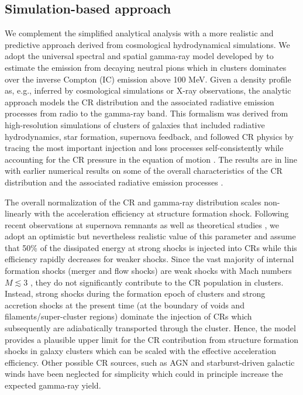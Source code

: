 \documentclass[12pt,manuscript]{aastex}
\begin{document}
\subsection{Simulation-based approach}
\label{sec:simulation}
We complement the simplified analytical analysis with a more realistic and predictive approach
derived from cosmological hydrodynamical simulations. We adopt the universal spectral and spatial
gamma-ray model developed by \citet{article:PinzkePfrommer:2010} to estimate the emission from
decaying neutral pions which in clusters dominates over the inverse Compton (IC) emission above
100 MeV. Given a density profile as, e.g., inferred by
cosmological simulations or X-ray observations, the analytic approach models the CR distribution and
the associated radiative emission processes from radio to the gamma-ray band. This formalism was
derived from high-resolution simulations of clusters of galaxies that included radiative hydrodynamics,
star formation, supernova feedback, and followed CR physics by tracing the most important injection
and loss processes self-consistently while accounting for the CR pressure in the equation of motion
\citep{article:PfrommerSpringelEnsslinJubelgas, article:EnsslinPfrommerSpringelJubelgas:2007,
  article:JubelgasSpringelEnsslinPfrommer:2008}. The results are in line with earlier numerical
results on some of the overall characteristics of the CR distribution and the associated radiative
emission processes \citep{article:DolagEnsslin:2000, article:MiniatiRyuKangJones:2001,
  article:Miniati:2003, article:Pfrommer_etal:2007, article:PfrommerEnsslinSpringel:2008,
  article:Pfrommer:2008}.
 
The overall normalization of the CR and gamma-ray distribution scales non-linearly with the
acceleration efficiency at structure formation shock. Following recent observations at
supernova remnants \citep{article:Helder_etal:2009} as well as theoretical studies
\citep{article:KangJones:2005}, we adopt an optimistic but nevertheless realistic value of this
parameter and assume that 50\% of the dissipated energy at strong shocks is injected into CRs while
this efficiency rapidly decreases for weaker shocks. Since the vast majority of internal formation
shocks (merger and flow shocks) are weak shocks with Mach numbers $M\lesssim3$
\citep[e.g.,][]{article:Ryu_etal:2003}, they do not significantly contribute to the CR population in
clusters. Instead, strong shocks during the formation epoch of clusters and strong accretion shocks
at the present time (at the boundary of voids and filaments/super-cluster regions) dominate the
injection of CRs which subsequently are adiabatically transported through the cluster. Hence, the model
provides a plausible upper limit for the CR contribution from structure formation shocks
in galaxy clusters which can be scaled with the effective acceleration efficiency. Other possible CR
sources, such as AGN and starburst-driven galactic winds have been neglected for simplicity which
could in principle increase the expected gamma-ray yield.
\end{document}
